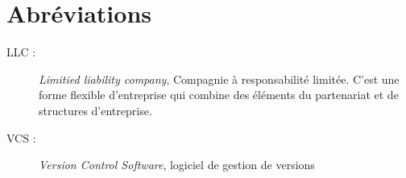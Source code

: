 \chapter*{Abréviations}

\begin{description}
    \item[LLC : ] \emph{Limitied liability company}, Compagnie à
        responsabilité limitée. C'est une forme flexible d'entreprise qui
        combine des éléments du partenariat et de structures d'entreprise.
    \item[VCS : ] \emph{Version Control Software}, logiciel de gestion de versions
\end{description}
